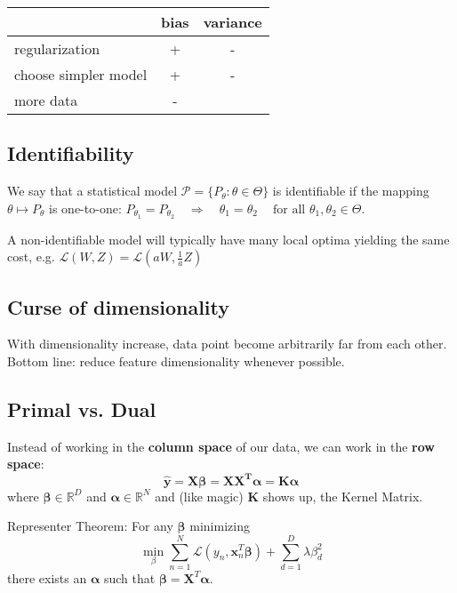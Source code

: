 \documentclass[10pt,a4paper,landscape]{article}
\renewcommand{\bf}[1]{\ensuremath{\mathbf{#1}}}
\newcommand{\balpha}{\boldsymbol\alpha}
\newcommand{\bbeta}{\boldsymbol\beta}
\begin{document}
\begin{multicols*}{4}
\begin{tabular}{ l || c | c }
                          & bias & variance \\
  \hline
  regularization          & +    & - \\
  choose simpler model    & +    & - \\
  more data               & -    & \\
  \hline
\end{tabular}

\subsection{Identifiability}
We say that a statistical model $\mathcal{P} = \{P_\theta: \theta \in \Theta\}$ is identifiable if the mapping $\theta \mapsto P_\theta$ is one-to-one:
$P_{\theta_1}=P_{\theta_2} \quad\Rightarrow\quad \theta_1=\theta_2 \quad\ \text{for all } \theta_1,\theta_2\in\Theta.$

A non-identifiable model will typically have many local optima yielding the same cost, e.g. $\mathcal{L}(W, Z) = \mathcal{L}(aW, \frac{1}{a} Z)$

\subsection{Curse of dimensionality}
With dimensionality increase, data point become arbitrarily far from each other. %
Bottom line: reduce feature dimensionality whenever possible.

\subsection{Primal vs. Dual}
Instead of working in the \textbf{column space} of our data, we can work in the \textbf{row space}:
$$\bf{\hat{y} = X \bbeta = X X^T \balpha = K \balpha}$$
where $\bbeta \in \mathbb{R}^D$ and $\balpha \in \mathbb{R}^N$
and (like magic) $\bf{K}$ shows up, the Kernel Matrix.

Representer Theorem: For any $\bbeta$ minimizing
$$\min_\beta \sum_{n=1}^N \mathcal{L}(y_n, \bf{x}_n^T \bbeta) + \sum_{d=1}^D \lambda \beta_d^2$$
there exists an $\balpha$ such that $\bbeta = \bf{X}^T \balpha$.


\end{multicols*}
\end{document}
